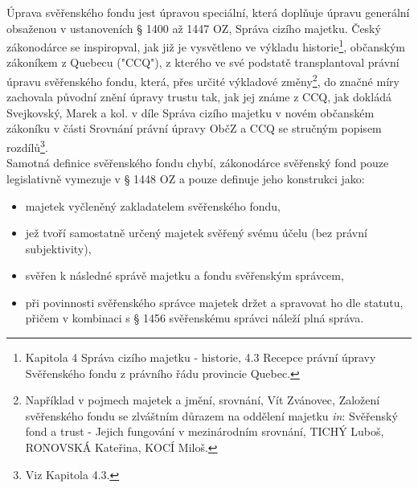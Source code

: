 \documentclass{article}
\begin{document}



Úprava svěřenského fondu jest úpravou speciální, která doplňuje úpravu generální obsaženou v ustanoveních § 1400 až 1447 OZ, Správa cizího majetku. Český zákonodárce se inspiropval, jak již je vysvětleno ve výkladu historie\footnote{Kapitola 4 Správa cizího majetku - historie, 4.3 Recepce právní úpravy Svěřenského fondu z právního řádu provincie Quebec.}, občanským zákoníkem z Quebecu ("CCQ"), z kterého ve své podstatě transplantoval právní úpravu svěřenského fondu, která, přes určité výkladové změny\footnote{Například v pojmech majetek a jmění, srovnání, Vít Zvánovec, Založení svěřenského fondu se zlváštním důrazem na oddělení majetku \textit{in}: Svěřenský fond a trust - Jejich fungování v mezinárodním srovnání, TICHÝ Luboš, RONOVSKÁ Kateřina, KOCÍ Miloš.}, do značné míry zachovala původní znění úpravy trustu tak, jak jej známe z CCQ, jak dokládá Svejkovský, Marek a kol. v díle Správa cizího majetku v novém občanském zákoníku v části Srovnání právní úpravy ObčZ a CCQ se stručným popisem rozdílů\footnote{Viz Kapitola 4.3.}.\\ 

Samotná definice svěřenského fondu chybí, zákonodárce svěřenský fond pouze legislativně vymezuje v § 1448 OZ a pouze definuje jeho konstrukci jako:\\

\begin{itemize}
\item majetek vyčleněný zakladatelem svěřenského fondu,
\item jež tvoří samostatně určený majetek svěřený svému účelu (bez právní subjektivity),
\item svěřen k následné správě majetku a fondu svěřenským správcem,
\item při povinnosti svěřenského správce majetek držet a spravovat ho dle statutu, přičem v kombinaci s § 1456 svěřenskému správci náleží plná správa.	
\end{itemize}
\end{document}
